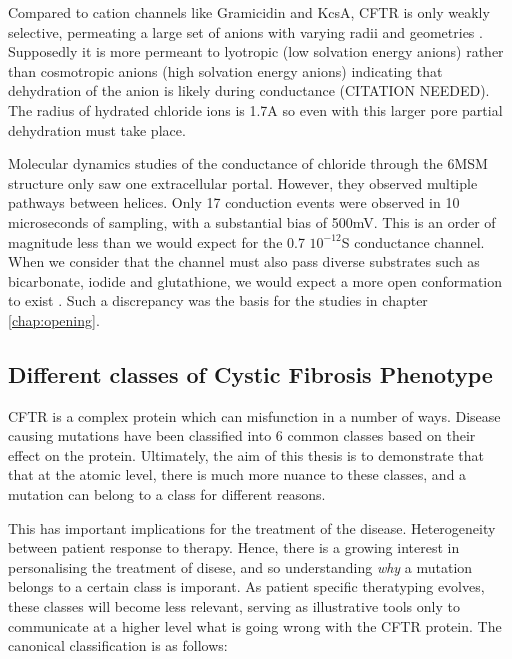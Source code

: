 Compared to cation channels like Gramicidin and KcsA, CFTR is only weakly selective, permeating a large set of anions with varying radii and geometries \cite{}. Supposedly it is more permeant to lyotropic (low solvation energy anions) rather than cosmotropic anions (high solvation energy anions) indicating that dehydration of the anion is likely during conductance (CITATION NEEDED). The radius of hydrated chloride ions is 1.7A \cite{yang2002} so even with this larger pore partial dehydration must take place. 

Molecular dynamics studies of the conductance of chloride through the 6MSM structure only saw one extracellular portal. However, they observed multiple pathways between helices. Only 17 conduction events were observed in 10 microseconds of sampling, with a substantial bias of 500mV. This is an order of magnitude less than we would expect for the 0.7 $10^{-12}$S conductance channel. When we consider that the channel must also pass diverse substrates such as bicarbonate, iodide and glutathione, we would expect a more open conformation to exist \cite{kogan2003,linsdell1998}. Such a discrepancy was the basis for the studies in chapter \ref{chap:opening}.


\subsection{Different classes of Cystic Fibrosis Phenotype}
CFTR is a complex protein which can misfunction in a number of ways. Disease causing mutations have been classified into 6 common classes based on their effect on the protein. Ultimately, the aim of this thesis is to demonstrate that that at the atomic level, there is much more nuance to these classes, and a mutation can belong to a class for different reasons. 

This has important implications for the treatment of the disease. Heterogeneity between patient response to therapy. Hence, there is a growing interest in personalising the treatment of disese, and so understanding \textit{why} a mutation belongs to a certain class is imporant. As patient specific theratyping evolves, these classes will become less relevant, serving as illustrative tools only to communicate at a higher level what is going wrong with the CFTR protein. The canonical classification is as follows:


